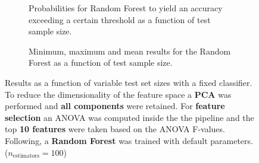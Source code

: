 \begin{figure}
    \captionsetup[subfigure]{justification=justified,singlelinecheck=false}
    \begin{subfigure}[t]{0.61\textwidth}
        
        \caption{Probabilities for Random Forest to yield an accuracy exceeding a certain threshold as a function of test sample size.}
    \end{subfigure}
    \hspace{3.0mm}
    \begin{subfigure}[t]{0.34\textwidth}
        
        \caption{Minimum, maximum and mean results for the Random Forest as a function of test sample size.}
    \end{subfigure}
    \caption[Effects of varying test sample size. Random Forest; Preprocessing: PCA ($n_\text{components} = \text{all}$); ANOVA feature selection ($k_\text{best} = \num{10}$)]{Results as a function of variable test set sizes with a fixed classifier. To reduce the dimensionality of the feature space a \textbf{PCA} was performed and \textbf{all components} were retained. For \textbf{feature selection} an ANOVA was computed inside the the pipeline and the top \textbf{\num{10} features} were taken based on the ANOVA F-values. Following, a \textbf{{Random Forest}} was trained with default parameters. ($n_\text{estimators}=\num{100}$)}
    \label{fig:PCA_all_components_10_best_selected_RandomForest}
\end{figure}

